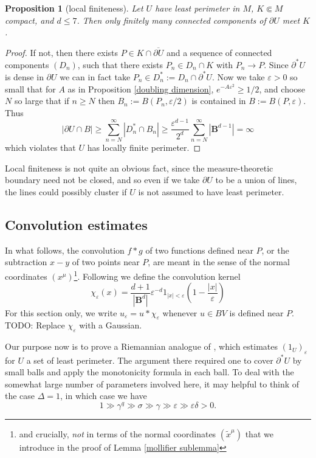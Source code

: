 \documentclass[reqno,12pt,letterpaper]{amsart}
\newcommand{\Ball}{\mathbf{B}}
\newtheorem{proposition}[theorem]{Proposition}
\theoremstyle{definition}
\numberwithin{equation}{section}
\begin{document}
\begin{proposition}[local finiteness]\label{local finiteness}
Let $U$ have least perimeter in $M$, $K \Subset M$ compact, and $d \leq 7$. Then only finitely many connected components of $\partial U$ meet $K$.
\end{proposition}
\begin{proof}
If not, then there exists $P \in K \cap \overline{\partial U}$ and a sequence of connected components $(D_n)$, such that there exists $P_n \in D_n \cap K$ with $P_n \to P$.
Since $\partial^* U$ is dense in $\partial U$ we can in fact take $P_n \in D_n^* := D_n \cap \partial^* U$.
Now we take $\varepsilon > 0$ so small that for $A$ as in Proposition \ref{doubling dimension}, $e^{-A\varepsilon^2} \geq 1/2$, and choose $N$ so large that if $n \geq N$ then $B_n := B(P_n, \varepsilon/2)$ is contained in $B := B(P, \varepsilon)$.
Thus
$$|\partial U \cap B| \geq \sum_{n=N}^\infty |D_n^* \cap B_n| \geq \frac{\varepsilon^{d - 1}}{2^d} \sum_{n=N}^\infty |\Ball^{d - 1}| = \infty$$
which violates that $U$ has locally finite perimeter.
\end{proof}

Local finiteness is not quite an obvious fact, since the measure-theoretic boundary need not be closed, and so even if we take $\partial U$ to be a union of lines, the lines could possibly cluster if $U$ is not assumed to have least perimeter.

\subsection{Convolution estimates}
In what follows, the convolution $f * g$ of two functions defined near $P$, or the subtraction $x - y$ of two points near $P$, are meant in the sense of the normal coordinates $(x^\mu)$\footnote{and crucially, \emph{not} in terms of the normal coordinates $(\tilde x^\mu)$ that we introduce in the proof of Lemma \ref{mollifier sublemma}}. Following \cite[Chapter 7]{Giusti77} we define the convolution kernel
$$\chi_\varepsilon(x) = \frac{d + 1}{|\Ball^d|} \varepsilon^{-d}1_{|x| < \varepsilon} \left(1 - \frac{|x|}{\varepsilon}\right)$$
For this section only, we write $u_\varepsilon = u * \chi_\varepsilon$ whenever $u \in BV$ is defined near $P$.
TODO: Replace $\chi_\varepsilon$ with a Gaussian.

Our purpose now is to prove a Riemannian analogue of \cite[Theorem 7.3]{Giusti77}, which estimates $(1_U)_\varepsilon$ for $U$ a set of least perimeter.
The argument there required one to cover $\partial^* U$ by small balls and apply the monotonicity formula in each ball.
To deal with the somewhat large number of parameters involved here, it may helpful to think of the case $\Delta = 1$, in which case we have 
$$1 \gg \gamma^q \gg \sigma \gg \gamma \gg \varepsilon \gg \varepsilon \delta > 0.$$
\end{document}
